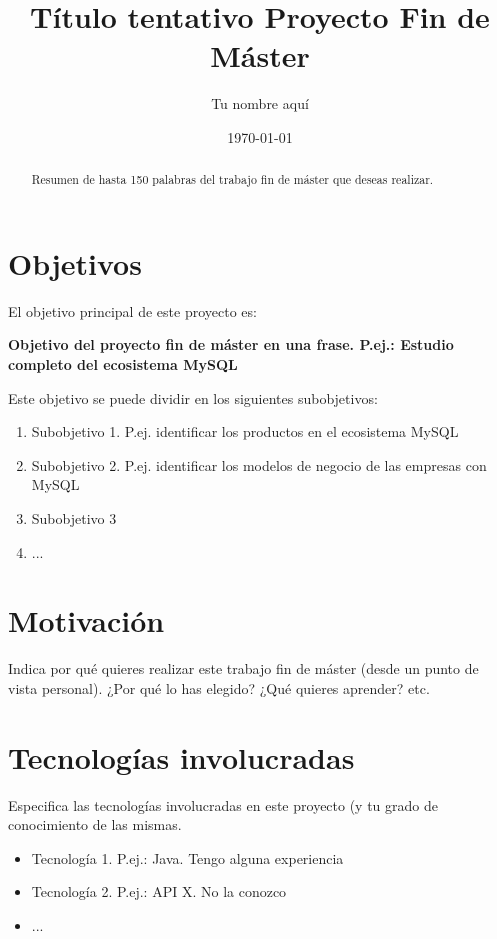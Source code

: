 \documentclass[10pt]{article}
\begin{document}
\title{Título tentativo Proyecto Fin de Máster}
\author{Tu nombre aquí}
\date{\today}


\maketitle

\begin{abstract}
Resumen de hasta 150 palabras del trabajo fin de máster que deseas realizar.
\end{abstract}

\section{Objetivos}

El objetivo principal de este proyecto es:

\begin{center}
\bf{Objetivo del proyecto fin de máster en una frase. P.ej.: Estudio completo del ecosistema MySQL}
\end{center}

Este objetivo se puede dividir en los siguientes subobjetivos:

\begin{enumerate}
  \item Subobjetivo 1. P.ej. identificar los productos en el ecosistema MySQL
  \item Subobjetivo 2. P.ej. identificar los modelos de negocio de las empresas con MySQL
  \item Subobjetivo 3
  \item ...
\end{enumerate}


\section{Motivación}

Indica por qué quieres realizar este trabajo fin de máster (desde un punto de vista personal). ¿Por qué lo has elegido? ¿Qué quieres aprender? etc.

\section{Tecnologías involucradas}

Especifica las tecnologías involucradas en este proyecto (y tu grado de conocimiento de las mismas.

\begin{itemize}
  \item Tecnología 1. P.ej.: Java. Tengo alguna experiencia
  \item Tecnología 2. P.ej.: API X. No la conozco
  \item ...
\end{itemize}
\end{document}
